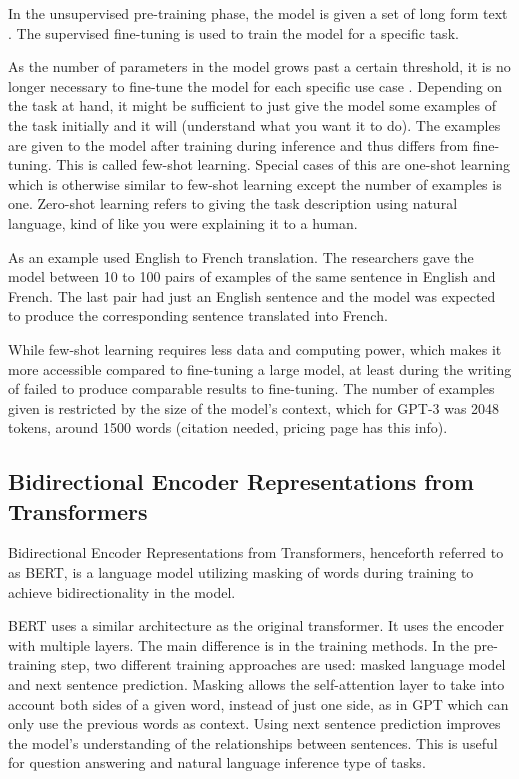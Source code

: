 \documentclass[twoside]{article}
\begin{document}
In the unsupervised pre-training phase, the model is given a set of long form text
\cite{radford_improving_nodate}. The supervised fine-tuning is used to train the
model for a specific task. 

As the number of parameters in the model grows past a certain threshold, it
is no longer necessary to fine-tune the model for each specific use case 
\cite{brown_language_2020}. Depending on the task at hand, it might be sufficient
to just give the model some examples of the task initially and it will (understand what you want it to do). The examples are given to
the model after training during inference and thus differs from fine-tuning. 
This is called few-shot learning. Special cases of this are one-shot learning which is
otherwise similar to few-shot learning except the number of examples is one.
Zero-shot learning refers to giving the task description using natural language,
kind of like you were explaining it to a human. 

As an example \cite{brown_language_2020} used English to French translation.
The researchers gave the model between 10 to 100 pairs of examples of the
same sentence in English and French. The last pair had just an English sentence
and the model was expected to produce the corresponding sentence translated into
French.

While few-shot learning requires less data and computing power, which makes it more
accessible compared to fine-tuning a large model, at least during the writing of 
\cite{brown_language_2020} failed to produce comparable results to fine-tuning.
The number of examples given is restricted by the size of the model's context,
which for GPT-3 was 2048 tokens, around 1500 words (citation needed, pricing page has this info).

\subsection{Bidirectional Encoder Representations from Transformers}
Bidirectional Encoder Representations from Transformers, henceforth referred to as BERT,
is a language model utilizing masking of words during training to achieve bidirectionality
in the model. \cite{devlin_bert_2019}

BERT uses a similar architecture as the original transformer. It uses the encoder with
multiple layers. The main difference is in the training methods. In the pre-training step,
two different training approaches are used: masked language model and next sentence prediction.
Masking allows the self-attention layer to take into account both sides of a given word, instead
of just one side, as in GPT which can only use the previous words as context. Using next sentence
prediction improves the model's understanding of the relationships between sentences. This is
useful for question answering and natural language inference type of tasks. \cite{devlin_bert_2019}
\end{document}
